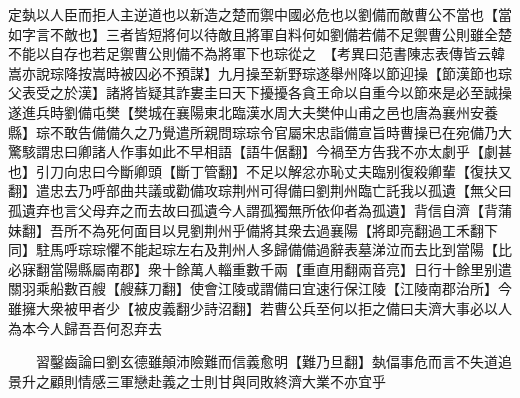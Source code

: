 定埶以人臣而拒人主逆道也以新造之楚而禦中國必危也以劉備而敵曹公不當也【當如字言不敵也】三者皆短將何以待敵且將軍自料何如劉備若備不足禦曹公則雖全楚不能以自存也若足禦曹公則備不為將軍下也琮從之　【考異曰范書陳志表傳皆云韓嵩亦說琮降按嵩時被囚必不預謀】九月操至新野琮遂舉州降以節迎操【節漢節也琮父表受之於漢】諸將皆疑其詐婁圭曰天下擾擾各貪王命以自重今以節來是必至誠操遂進兵時劉備屯樊【樊城在襄陽東北臨漢水周大夫樊仲山甫之邑也唐為襄州安養縣】琮不敢告備備久之乃覺遣所親問琮琮令官屬宋忠詣備宣旨時曹操已在宛備乃大驚駭謂忠曰卿諸人作事如此不早相語【語牛倨翻】今禍至方告我不亦太劇乎【劇甚也】引刀向忠曰今斷卿頭【斷丁管翻】不足以解忿亦恥丈夫臨别復殺卿輩【復扶又翻】遣忠去乃呼部曲共議或勸備攻琮荆州可得備曰劉荆州臨亡託我以孤遺【無父曰孤遺弃也言父母弃之而去故曰孤遺今人謂孤獨無所依仰者為孤遺】背信自濟【背蒲妹翻】吾所不為死何面目以見劉荆州乎備將其衆去過襄陽【將即亮翻過工禾翻下同】駐馬呼琮琮懼不能起琮左右及荆州人多歸備備過辭表墓涕泣而去比到當陽【比必寐翻當陽縣屬南郡】衆十餘萬人輜重數千兩【重直用翻兩音亮】日行十餘里别遣關羽乘船數百艘【艘蘇刀翻】使會江陵或謂備曰宜速行保江陵【江陵南郡治所】今雖擁大衆被甲者少【被皮義翻少詩沼翻】若曹公兵至何以拒之備曰夫濟大事必以人為本今人歸吾吾何忍弃去

　　習鑿齒論曰劉玄德雖顛沛險難而信義愈明【難乃旦翻】埶偪事危而言不失道追景升之顧則情感三軍戀赴義之士則甘與同敗終濟大業不亦宜乎

